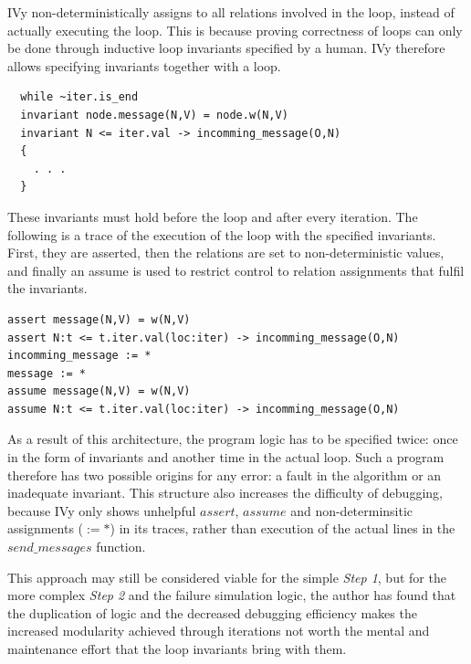 \documentclass[fleqn]{article}
\begin{document}
IVy non-deterministically assigns to all relations involved in the loop, instead of actually executing the loop.  This is because proving correctness of loops can only be done through inductive loop invariants specified by a human. IVy therefore allows specifying invariants together with a loop.
\begin{mdframed}[nobreak=true, backgroundcolor=light-gray, roundcorner=10pt,leftmargin=1, rightmargin=1, innerleftmargin=15, innertopmargin=15,innerbottommargin=15, outerlinewidth=1, linecolor=light-gray]
\begin{lstlisting}
  while ~iter.is_end
  invariant node.message(N,V) = node.w(N,V)
  invariant N <= iter.val -> incomming_message(O,N)
  {
    . . .
  }
\end{lstlisting}
\end{mdframed}

These invariants must hold before the loop and after every iteration. The following is a trace of the execution of the loop with the specified invariants. First, they are asserted, then the relations are set to non-deterministic values, and finally an assume is used to restrict control to relation assignments that fulfil the invariants.

\begin{mdframed}[nobreak=true, backgroundcolor=light-gray, roundcorner=10pt,leftmargin=1, rightmargin=1, innerleftmargin=15, innertopmargin=15,innerbottommargin=15, outerlinewidth=1, linecolor=light-gray]
\begin{lstlisting}
assert message(N,V) = w(N,V)
assert N:t <= t.iter.val(loc:iter) -> incomming_message(O,N)
incomming_message := *
message := *
assume message(N,V) = w(N,V)
assume N:t <= t.iter.val(loc:iter) -> incomming_message(O,N)
\end{lstlisting}
\end{mdframed}

As a result of this architecture, the program logic has to be specified twice: once in the form of invariants and another time in the actual loop. Such a program therefore has two possible origins for any error: a fault in the algorithm or an inadequate invariant. This structure also increases the difficulty of debugging, because IVy only shows unhelpful $assert$, $assume$ and  non-determinsitic assignments ($:= *$) in its traces, rather than execution of the actual lines in the $send\_messages$ function.

This approach may still be considered viable for the simple \textit{Step 1}, but for the more complex \textit{Step 2} and the failure simulation logic, the author has found that the duplication of logic and the decreased debugging efficiency makes the increased modularity achieved through iterations not worth the mental and maintenance effort that the loop invariants bring with them.
\end{document}

